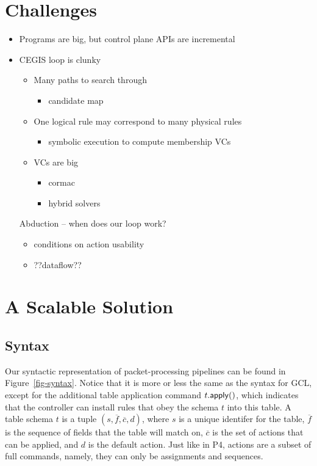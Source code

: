   
\section{Challenges}
\begin{itemize}
\item Programs are big, but control plane APIs are incremental
\item CEGIS loop is clunky
  \begin{itemize}
  \item Many paths to search through
    \begin{itemize} \item candidate map \end{itemize}
  \item One logical rule may correspond to many physical rules
    \begin{itemize} \item symbolic execution to compute membership VCs \end{itemize}
  \item VCs are big
    \begin{itemize}
    \item cormac
    \item hybrid solvers
    \end{itemize}
  \end{itemize}
Abduction -- when does our loop work?
  \begin{itemize}
  \item conditions on action usability
  \item ??dataflow??
  \end{itemize}
\end{itemize}

\section{A Scalable Solution}

\subsection{Syntax}

Our syntactic representation of packet-processing pipelines can be
found in Figure~\ref{fig-syntax}. Notice that it is more or less the
same as the syntax for GCL, except for the additional table
application command $t.\mathsf{apply}()$, which indicates that the controller
can install rules that obey the schema $t$ into this table. A table
schema $t$ is a tuple $(s, \overline f, \overline c, d)$, where $s$ is
a unique identifer for the table, $\overline f$ is the sequence of
fields that the table will match on, $\overline c$ is the set of
actions that can be applied, and $d$ is the default action. Just like
in P4, actions are a subset of full commands, namely, they can only be
assignments and sequences.


